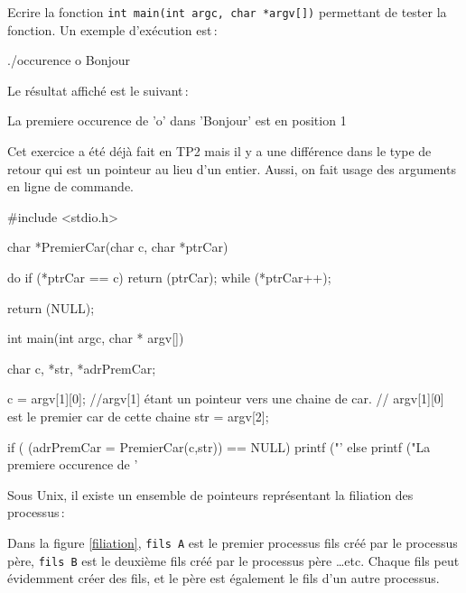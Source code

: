 \documentclass[10pt]{article}\usepackage[nu]{esial}
\begin{document}

\Question
Ecrire la fonction {\tt int main(int argc, char *argv[])} permettant
de tester la fonction. Un exemple d'exécution est\,:

\medskip

\begin{boxedverbatim}
./occurence  o Bonjour
\end{boxedverbatim}

\medskip

Le résultat affiché est le suivant\,:

\medskip

\begin{boxedverbatim}
La premiere occurence de 'o' dans 'Bonjour' est en position 1
\end{boxedverbatim}

\begin{Reponse}
  Cet exercice a été déjà fait en TP2 mais il y a une différence dans
  le type de retour qui est un pointeur au lieu d'un entier. Aussi, on
  fait usage des arguments en ligne de commande.

\begin{boxedverbatim}
#include <stdio.h>

char *PremierCar(char c, char *ptrCar){
  do
    if (*ptrCar == c)
      return (ptrCar);
  while (*ptrCar++);

  return (NULL);
}

int main(int argc, char * argv[]){

  char c, *str, *adrPremCar;

  c = argv[1][0]; //argv[1] étant un pointeur vers une chaine de car.
                  // argv[1][0] est le premier car de cette chaine
  str = argv[2];

  if ( (adrPremCar = PremierCar(c,str)) == NULL) 
    printf ("'%
  else
    printf ("La premiere occurence de '%
}
\end{boxedverbatim}
\end{Reponse}
    



\bigskip\bigskip{}

Sous Unix, il existe un ensemble de pointeurs représentant la
filiation des  processus\,: 

Dans la figure \ref{filiation}, {\tt fils A} est le premier processus
fils créé par le processus père, {\tt fils B} est le deuxième fils
créé par le processus père \ldots etc.
Chaque fils peut évidemment créer des fils, et le père est également le
fils d'un autre processus.
\end{document}
